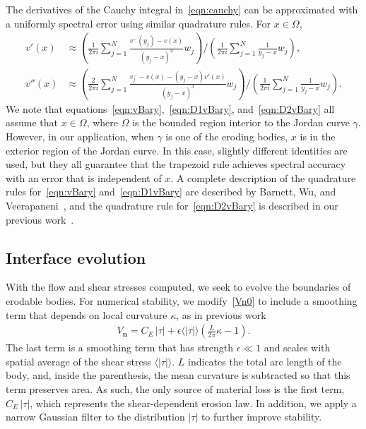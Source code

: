 \documentclass[3p]{elsarticle}
\newcommand{\nn}{{\mathbf{n}}}
\newcommand{\abs}[1]{\left| #1 \right|}
\newcommand{\Vn}{V_\nn}
\newcommand{\CE}{C_E}
\begin{document}
The derivatives of the Cauchy integral in~\eqref{eqn:cauchy} can be
approximated with a uniformly spectral error using similar quadrature
rules. For $x \in \Omega$, 
\begin{align}
  v'(x) &\approx \left(\frac{1}{2\pi i}\sum_{j=1}^{N}
    \frac{v^{-}(y_j) - v(x)}{(y_j-x)^2} w_j \right)
  \Bigg/
  \left(\frac{1}{2\pi i}\sum_{j=1}^{N} \frac{1}{y_j-x} w_j\right), 
  \label{eqn:D1vBary} \\
  v''(x) &\approx \left(\frac{2}{2\pi i}\sum_{j=1}^N 
    \frac{v^{-}_{j} - v(x) - (y_j-x)v'(x)}{(y_j-x)^3}w_j \right)
    \Bigg/
    \left(\frac{1}{2\pi i}\sum_{j=1}^N \frac{1}{y_j-x}w_j\right).
  \label{eqn:D2vBary}
\end{align}
We note that equations~\eqref{eqn:vBary},~\eqref{eqn:D1vBary},
and~\eqref{eqn:D2vBary} all assume that $x \in \Omega$, where $\Omega$
is the bounded region interior to the Jordan curve $\gamma$. However, in
our application, when $\gamma$ is one of the eroding bodies, $x$ is in
the exterior region of the Jordan curve. In this case, slightly
different identities are used, but they all guarantee that the trapezoid
rule achieves spectral accuracy with an error that is independent of
$x$. A complete description of the quadrature rules
for~\eqref{eqn:vBary} and~\eqref{eqn:D1vBary} are described by Barnett,
Wu, and Veerapaneni~\cite{bar-wu-vee2015}, and the quadrature rule
for~\eqref{eqn:D2vBary} is described in our previous
work~\cite{chiu2020viscous}.




\subsection{Interface evolution}

With the flow and shear stresses computed, we seek to evolve the boundaries of erodable bodies. For numerical stability, we modify~\eqref{Vn0} to include a smoothing term that depends on local curvature $\kappa$, as in previous work~\cite{quaife2018boundary}
\begin{align}
  \Vn = \CE \, \abs{\tau} + \epsilon \langle\abs{\tau}\rangle \left(
    \frac{L}{2\pi} \kappa - 1 \right).
\end{align}
The last term is a smoothing term that has strength $\epsilon \ll 1$ and scales with spatial average of the shear stress $\langle\abs{\tau}\rangle$. $L$ indicates the total arc length of the body, and, inside the parenthesis, the mean curvature is subtracted so that this term preserves area. As such, the only source of material loss is the first term, $\CE \, \abs{\tau}$, which represents the shear-dependent erosion law. In addition, we apply a narrow Gaussian filter to the distribution $\abs{\tau}$ to further improve stability.
\end{document}
